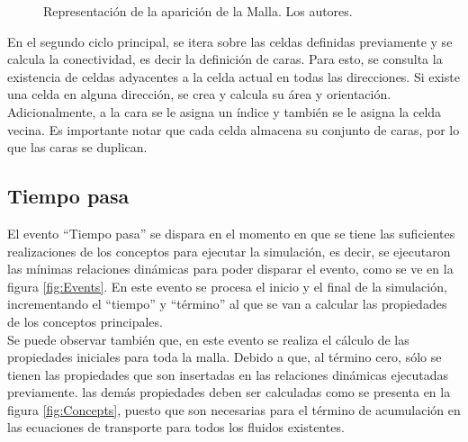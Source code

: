\begin{figure}[h]
	\caption[Representación de la aparición de la Malla.]{Representación de la aparición de la Malla. Los autores.} \label{fig:MeshAppears}
\end{figure}

En el segundo ciclo principal, se itera sobre las celdas definidas previamente y se calcula la conectividad, es decir la definición de caras. Para esto, se consulta la existencia de celdas adyacentes a la celda actual en todas las direcciones. Si existe una celda en alguna dirección, se crea y calcula su área y orientación. Adicionalmente, a la cara se le asigna un índice y también se le asigna la celda vecina. Es importante notar que cada celda almacena su conjunto de caras, por lo que las caras se duplican.

\subsection{Tiempo pasa}\label{sec:PS_TimePasses}
El evento ``Tiempo pasa'' se dispara en el momento en que se tiene las suficientes realizaciones de los conceptos para ejecutar la simulación, es decir, se ejecutaron las mínimas relaciones dinámicas para poder disparar el evento, como se ve en la figura \ref{fig:Events}. En este evento se procesa el inicio y el final de la simulación, incrementando el ``tiempo'' y ``término'' al que se van a calcular las propiedades de los conceptos principales.\\

Se puede observar también que, en este evento se realiza el cálculo de las propiedades iniciales para toda la malla. Debido a que, al término cero, sólo se tienen las propiedades que son insertadas en las relaciones dinámicas ejecutadas previamente. las demás propiedades deben ser calculadas como se presenta en la figura \ref{fig:Concepts}, puesto que son necesarias para el término de acumulación en las ecuaciones de transporte para todos los fluidos existentes.

